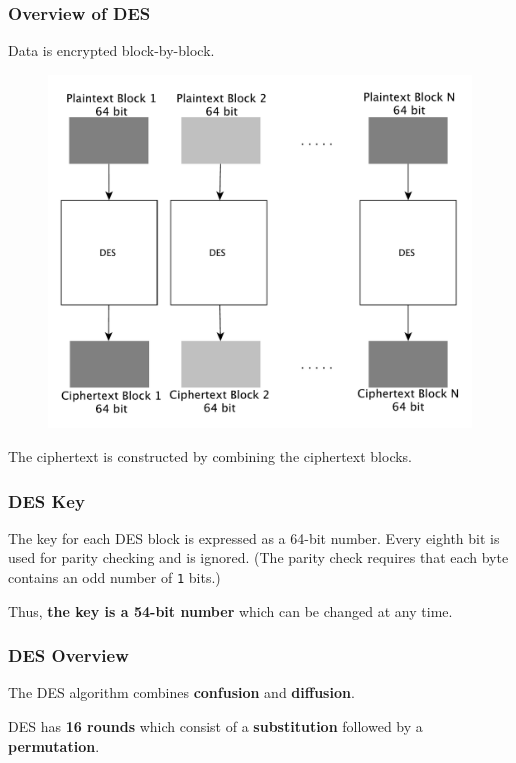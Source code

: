 \documentclass{beamer}
\newcommand{\<}{\langle}
\renewcommand{\>}{\rangle}
\begin{document}
\begin{frame}
\frametitle{Overview of DES}

Data is encrypted block-by-block.

\begin{figure}
\includegraphics[scale=.3]{IMG/des1}
\end{figure}

The ciphertext is constructed by combining the ciphertext blocks. 
\end{frame}


\begin{frame}[fragile]
\frametitle{DES Key}

The key for each DES block is expressed as a 64-bit number. Every eighth bit is used for parity checking and is ignored. (The parity check requires that each byte contains an odd number of \verb|1| bits.)\newline

  Thus, \textbf{the key is a 54-bit number} which can be changed at any time. 
\end{frame}



\begin{frame}
\frametitle{DES Overview}

The DES algorithm combines \textbf{confusion} and \textbf{diffusion}. \newline

DES has \textbf{16 rounds} which consist of a \textbf{substitution} followed by a \textbf{permutation}.
\end{frame}
\end{document}
